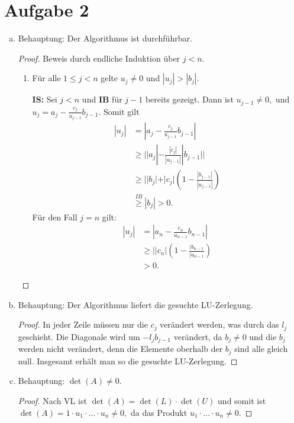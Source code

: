 \documentclass{article}
\theoremstyle{definition}
\begin{document}
\section*{Aufgabe 2}
\begin{enumerate}[(a)]
    \item Behauptung: Der Algorithmus ist durchführbar.
          \begin{proof} Beweis durch endliche Induktion über $j<n.$
              \begin{enumerate}[\textbf{IB:}]
                  \item Für alle $1\leq j<n$ gelte $u_j\neq 0$ und $|u_j|>|b_j|.$
                  \item [\textbf{IS:}] Sei $j<n$ und \textbf{IB} für $j-1$ bereits gezeigt. Dann ist $u_{j-1}\neq 0, $ und $u_j=a_j-\frac{c_j}{u_{j-1}}b_{j-1}.$ Somit gilt
                        \begin{align*}
                            |u_j| & =|a_j-\frac{c_j}{u_{j-1}}b_{j-1}|                \\
                                  & \geq ||a_j|-\frac{|c_j|}{|u_{j-1}|}|b_{j-1}||    \\
                                  & \geq ||b_j|+|c_j|(1-\frac{|b_{j-1}|}{|u_{j-1}|}) \\
                                  & \overset{IB}{\geq}|b_j|>0.
                        \end{align*}
                        Für den Fall $j=n$ gilt:
                        \begin{align*}
                            |u_j| & =|a_n-\frac{c_n}{u_{n-1}}b_{n-1}|        \\
                                  & \geq ||c_n|(1-\frac{|b_{n-1}}{|u_{n-1}}) \\
                                  & >0.
                        \end{align*}
              \end{enumerate}
          \end{proof}
    \item Behauptung: Der Algorithmus liefert die gesuchte LU-Zerlegung.
          \begin{proof}
              In jeder Zeile müssen nur die $c_j$ verändert werden, was durch das $l_j$ geschieht. Die Diagonale wird um $-l_jb_{j-1}$ verändert, da $b_j\neq 0$ und die $b_j$ werden nicht verändert, denn die Elemente oberhalb der $b_j$ sind alle gleich null. Insgesamt erhält man so die gesuchte LU-Zerlegung.
          \end{proof}
    \item Behauptung: $\det(A)\neq 0.$
          \begin{proof}
              Nach VL ist $\det(A)=\det(L)\cdot\det(U)$ und somit ist $\det(A)=1\cdot u_1\cdot...\cdot u_n\neq 0,$ da das Produkt $u_1\cdot...\cdot u_n\neq 0.$
          \end{proof}
\end{enumerate}
\end{document}
